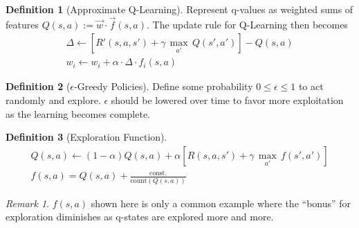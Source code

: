 \documentclass[11pt]{article}
\theoremstyle{definition}
\newtheorem{definition}{Definition}[section]
\theoremstyle{remark}
\newtheorem*{remark}{Remark}
\begin{document}
\begin{definition}[Approximate Q-Learning] Represent q-values as weighted sums of features $Q(s,a) := \vec{w} \cdot \vec{f}(s,a)$. The update rule for Q-Learning then becomes
\begin{align*}
\Delta \gets [R'(s,a,s')+\gamma \, \underset{a'}{\max}\,Q(s',a')]-Q(s,a) \\
w_i \gets w_i + \alpha \cdot \Delta \cdot f_i(s,a)
\end{align*}
\end{definition}

\begin{definition}[$\epsilon$-Greedy Policies]
Define some probability $0\leq \epsilon \leq 1$ to act randomly and explore. $\epsilon$ should be lowered over time to favor more exploitation as the learning becomes complete.
\end{definition}

\begin{definition}[Exploration Function]
\begin{align*}
Q(s,a) \gets (1-\alpha)Q(s,a) + \alpha [R(s,a,s')+\gamma \, \underset{a'}{\max}\,f(s',a')] \\
f(s,a) = Q(s,a)+\tfrac{\text{const.}}{\text{count}(Q(s,a))}
\end{align*}
\end{definition}

\begin{remark}
$f(s,a)$ shown here is only a common example where the ``bonus'' for exploration diminishes as q-states are explored more and more.
\end{remark}
\end{document}
